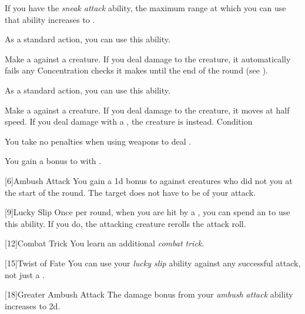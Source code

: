              If you have the \textit{sneak attack} ability, the maximum range at which you can use that ability increases to \rnglong.

             As a standard action, you can use this ability.
            \begin{ability}
                \begin{spelleffects}
                    \spelleffect Make a  against a creature.
                    If you deal damage to the creature, it automatically fails any Concentration checks it makes until the end of the round (see ).
                \end{spelleffects}
            \end{ability}

             As a standard action, you can use this ability.
            \begin{ability}
                \begin{spelleffects}
                    \spelleffect Make a  against a creature.
                    If you deal damage to the creature, it moves at half speed.
                    If you deal damage with a , the creature is \immobilized instead.
                    \spelldur Condition
                \end{spelleffects}
            \end{ability}

             You take no penalties when using weapons to deal .


             You gain a  bonus to  with .

            [6]{Ambush Attack}
            You gain a \plus1d bonus to  against creatures who did not  you at the start of the round.
            The target does not have to be \unaware of your attack.

            [9]{Lucky Slip} Once per round, when you are hit by a , you can spend an  to use this ability.
            If you do, the attacking creature rerolls the attack roll.

            [12]{Combat Trick}
            You learn an additional \textit{combat trick}.

            [15]{Twist of Fate} You can use your \textit{lucky slip} ability against any successful attack, not just a .

            [18]{Greater Ambush Attack}
            The damage bonus from your \textit{ambush attack} ability increases to \plus2d.
